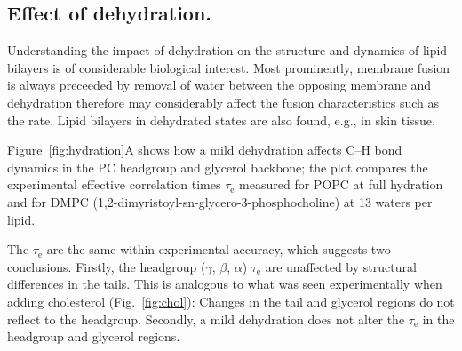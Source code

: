 \documentclass[journal=jcisd8,manuscript=article,layout=twocolumn]{achemso}
\begin{document}
\subsection*{Effect of dehydration.}
Understanding the impact of dehydration on the structure and dynamics of lipid bilayers is of considerable biological interest. Most prominently, membrane fusion is always preceeded by removal of water between the opposing membrane and dehydration therefore may considerably affect the fusion characteristics such as the rate. Lipid bilayers in dehydrated states are also found, e.g., in skin tissue. 

Figure~\ref{fig:hydration}A shows how a mild dehydration affects
C--H bond dynamics in the PC headgroup and glycerol backbone;
the plot compares the experimental effective correlation times $\tau_\mathrm e$
measured for POPC at full hydration and for DMPC (1,2-dimyristoyl-sn-glycero-3-phosphocholine)
at 13 waters per lipid.


The $\tau_\mathrm e$ are the same within experimental accuracy, which suggests two conclusions. Firstly, 
the headgroup ($\gamma$, $\beta$, $\alpha$) $\tau_\mathrm e$ are unaffected by structural differences in the tails. This is analogous to  what was seen experimentally when adding cholesterol
(Fig.~\ref{fig:chol}): Changes in the tail and glycerol regions do not reflect to the headgroup. Secondly, a mild dehydration does not alter the $\tau_\mathrm e$
in the headgroup and glycerol regions. 
\end{document}

